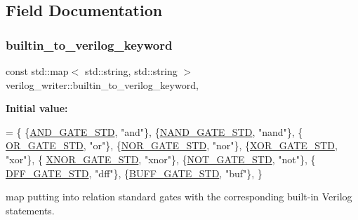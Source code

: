 \subsection{Field Documentation}
\mbox{\label{classverilog__writer_a4ee76148a5f6bc7b24a8c40fb189024c}} 
\subsubsection{\texorpdfstring{builtin\+\_\+to\+\_\+verilog\+\_\+keyword}{builtin\_to\_verilog\_keyword}}
{\footnotesize\ttfamily const std\+::map$<$ std\+::string, std\+::string $>$ verilog\+\_\+writer\+::builtin\+\_\+to\+\_\+verilog\+\_\+keyword\hspace{0.3cm}{\ttfamily [static]}, {\ttfamily [protected]}}

{\bfseries Initial value\+:}
\begin{DoxyCode}
= \{
    \{\hyperlink{technology__node_8hpp_a92082a6ad93e10690c4c96dac3496de8}{AND\_GATE\_STD}, \textcolor{stringliteral}{"and"}\}, \{\hyperlink{technology__node_8hpp_a7974f9e003d7a03cd6f5ee77776e96bc}{NAND\_GATE\_STD}, \textcolor{stringliteral}{"nand"}\}, \{
      \hyperlink{technology__node_8hpp_a87cd9ed4dfee4f2e1b5038b2481a0389}{OR\_GATE\_STD}, \textcolor{stringliteral}{"or"}\}, \{\hyperlink{technology__node_8hpp_a1fecfe90c2de839f25b398a9b35de824}{NOR\_GATE\_STD}, \textcolor{stringliteral}{"nor"}\}, \{\hyperlink{technology__node_8hpp_a9d6515322948561c31b33d0d90b0de86}{XOR\_GATE\_STD}, \textcolor{stringliteral}{"xor"}\}, \{
      \hyperlink{technology__node_8hpp_ac79b1d384347df522948c8776307638f}{XNOR\_GATE\_STD}, \textcolor{stringliteral}{"xnor"}\}, \{\hyperlink{technology__node_8hpp_a8544e5c1fc3fc2bd6b1acf5a5d64a55d}{NOT\_GATE\_STD}, \textcolor{stringliteral}{"not"}\}, \{
      \hyperlink{technology__node_8hpp_a5a94e3e159e1d4f641a59efa7d5b2c57}{DFF\_GATE\_STD}, \textcolor{stringliteral}{"dff"}\}, \{\hyperlink{technology__node_8hpp_ae8b9d1b555dd8fd5f07d11d83aa279a3}{BUFF\_GATE\_STD}, \textcolor{stringliteral}{"buf"}\},
\}
\end{DoxyCode}


map putting into relation standard gates with the corresponding built-\/in Verilog statements. 



